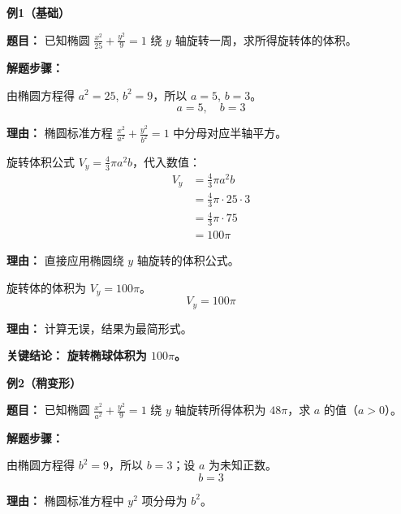 \begin{examplebox}

\textbf{\textcolor{CExample}{例1（基础）}}

\textbf{\textcolor{CExample}{题目：}} 已知椭圆 $\frac{x^2}{25}+\frac{y^2}{9}=1$ 绕 $y$ 轴旋转一周，求所得旋转体的体积。

\textbf{\textcolor{CExample}{解题步骤：}}
\begin{description}[style=nextline, leftmargin=2.8em, labelsep=0.5em, itemsep=0.45em]
    \item[\textbf{第一步（识别半轴）：}] 由椭圆方程得 $a^2=25$, $b^2=9$，所以 $a=5$, $b=3$。
    \[
    a=5,\quad b=3
    \]
    \par\textbf{理由：} 椭圆标准方程 $\frac{x^2}{a^2}+\frac{y^2}{b^2}=1$ 中分母对应半轴平方。

    \item[\textbf{第二步（套用体积公式）：}] 旋转体积公式 $V_y=\frac{4}{3}\pi a^2 b$，代入数值：
    \[
    \begin{aligned}
    V_y &= \frac{4}{3}\pi a^2 b \\
    &= \frac{4}{3}\pi \cdot 25 \cdot 3 \\
    &= \frac{4}{3}\pi \cdot 75 \\
    &= 100\pi
    \end{aligned}
    \]
    \par\textbf{理由：} 直接应用椭圆绕 $y$ 轴旋转的体积公式。

    \item[\textbf{第三步（得出结论）：}] 旋转体的体积为 $V_y = 100\pi$。
    \[
    V_y = 100\pi
    \]
    \par\textbf{理由：} 计算无误，结果为最简形式。
\end{description}

\textbf{\textcolor{CExample}{关键结论：}} \textbf{旋转椭球体积为 $100\pi$。}

\medskip
\textbf{\textcolor{CExample}{例2（稍变形）}}

\textbf{\textcolor{CExample}{题目：}} 已知椭圆 $\frac{x^2}{a^2}+\frac{y^2}{9}=1$ 绕 $y$ 轴旋转所得体积为 $48\pi$，求 $a$ 的值（$a>0$）。

\textbf{\textcolor{CExample}{解题步骤：}}
\begin{description}[style=nextline, leftmargin=2.8em, labelsep=0.5em, itemsep=0.45em]
    \item[\textbf{第一步（确定已知半轴）：}] 由椭圆方程得 $b^2=9$，所以 $b=3$；设 $a$ 为未知正数。
    \[
    b=3
    \]
    \par\textbf{理由：} 椭圆标准方程中 $y^2$ 项分母为 $b^2$。


\end{description}
\end{examplebox}
